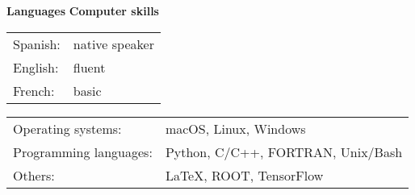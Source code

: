 \begin{multicols}{2}
	\textbf{Languages}
	\vfill
	\columnbreak
	\textbf{Computer skills}
\end{multicols}

\renewcommand{\arraystretch}{1.5}
\begin{multicols}{2}
    \noindent
    \begin{tabular}{>{\raggedright\arraybackslash}p{} >{\raggedleft\arraybackslash}p{}}
        Spanish: & native speaker \\
        English: & fluent \\
        French: & basic \\
    \end{tabular}

    \columnbreak

    \noindent
    \begin{tabular}{>{\raggedright\arraybackslash}p{} >{\raggedleft\arraybackslash}p{}}
        Operating systems: & macOS, Linux, Windows \\
        Programming languages: & Python, C/C++, FORTRAN, Unix/Bash \\
        Others: & \LaTeX, ROOT, TensorFlow \\
    \end{tabular}
\end{multicols}
